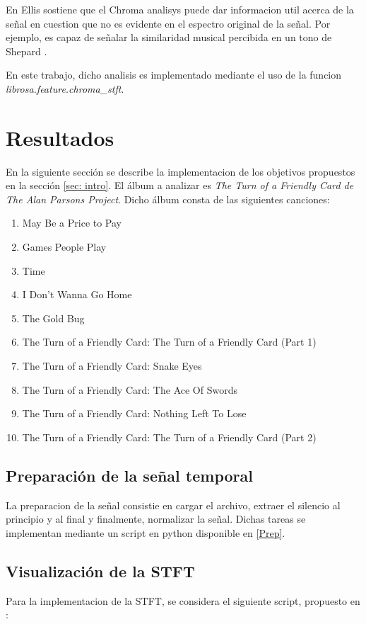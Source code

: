 \documentclass[]{article}
\begin{document}
\begin{multicols}{2}
En \cite{Ellis} Ellis sostiene que el Chroma analisys puede dar informacion
util acerca de la señal en cuestion que no es evidente en el espectro original de
la señal. Por ejemplo, es capaz de señalar la similaridad musical percibida en
un tono de Shepard \cite{bello}.

En este trabajo, dicho analisis es implementado mediante el uso de la funcion \emph{{librosa.feature.chroma\_stft}}.

\section{Resultados}
En la siguiente sección se describe la implementacion de los objetivos propuestos
en la sección \ref{sec: intro}. El álbum a analizar es \emph{The Turn of a Friendly
Card  \emph{de} The Alan Parsons Project}. Dicho álbum consta de las siguientes
canciones:
\begin{enumerate}
  \item May Be a Price to Pay
  \item Games People Play
  \item Time
  \item I Don't Wanna Go Home
  \item The Gold Bug
  \item The Turn of a Friendly Card: The Turn of a Friendly Card (Part 1)
  \item The Turn of a Friendly Card: Snake Eyes
  \item The Turn of a Friendly Card: The Ace Of Swords
  \item The Turn of a Friendly Card: Nothing Left To Lose
  \item The Turn of a Friendly Card: The Turn of a Friendly Card (Part 2)
\end{enumerate}

\subsection{Preparación de la señal temporal}
\label{sec: prep}
La preparacion de la señal consistie en cargar el archivo, extraer el silencio
al principio y al final y finalmente, normalizar la señal. Dichas tareas se
implementan mediante un script en python disponible en \ref{Prep}.

\subsection{Visualización de la STFT}
\label{sec: stft}
Para la implementacion de la STFT, se considera el siguiente script, propuesto
en \cite{stft}:



\end{multicols}
\end{document}
